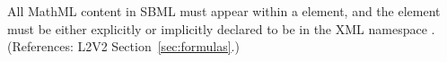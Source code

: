 All MathML content in SBML must appear within a  element, and
the  element must be either explicitly or implicitly declared
to be in the XML namespace .
(References: L2V2 Section~\ref{sec:formulas}.)
